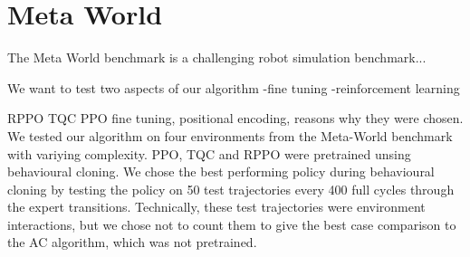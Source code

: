 \section{Meta World}
The Meta World benchmark is a challenging robot simulation benchmark...

We want to test two aspects of our algorithm
-fine tuning
-reinforcement learning

RPPO TQC PPO fine tuning, positional encoding, reasons why they were chosen.
We tested our algorithm on four environments from the Meta-World benchmark with variying complexity. 
PPO, TQC and RPPO were pretrained unsing behavioural cloning. We chose the best performing policy during behavioural cloning by testing the policy on 50 test 
trajectories every 400 full cycles through the 
expert transitions. Technically, these test trajectories were environment interactions, but we chose not to count them to give the best case comparison to the AC algorithm, which was not pretrained. 


